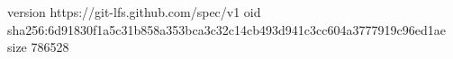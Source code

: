 version https://git-lfs.github.com/spec/v1
oid sha256:6d91830f1a5c31b858a353bca3c32c14cb493d941c3cc604a3777919c96ed1ae
size 786528
